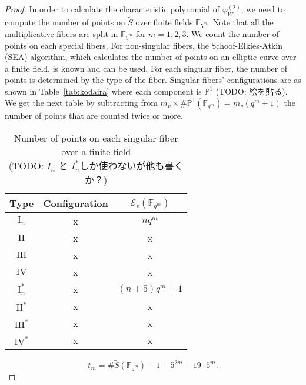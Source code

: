 \documentclass[main]{subfiles}
\begin{document}
\begin{proof}
    In order to calculate the characteristic polynomial of $\varphi^{(2)}_{W}$, we need to compute the number of points on $\tilde{S}$ over finite fields $\mathbb{F}_{5^{m}}$.
    Note that all the multiplicative fibers are split in $\mathbb{F}_{5^{m}}$ for $m=1,2,3$.
    We count the number of points on each special fibers.
    For non-singular fibers, the Schoof-Elkies-Atkin (SEA) algorithm, which calculates the number of points on an elliptic curve over a finite field, is known and can be used.
    For each singular fiber, the number of points is determined by the type of the fiber.
    Singular fibers' configurations are as shown in Table~\ref{tab:kodaira} where each component is $\mathbb{P}^{1}$ (TODO: 絵を貼る).
    We get the next table by subtracting from $m_v\times\#\mathbb{P}^1(\mathbb{F}_{q^m}) = m_v(q^m + 1)$ the number of points that are counted twice or more.
    \begin{table}[ht]
        \centering
        \caption{Number of points on each singular fiber over a finite field\\ (TODO: $I_n$ と $I_n^*$しか使わないが他も書くか？)}
        \begin{tabular}{|c|c|c|}
            \hline
            Type             & Configuration & $\mathcal{E}_v(\mathbb{F}_{q^{m}})$ \\
            \hline
            $\mathrm{I}_n$   & x             & $nq^m$                              \\
            $\mathrm{II}$    & x             & x                                   \\
            $\mathrm{III}$   & x             & x                                   \\
            $\mathrm{IV}$    & x             & x                                   \\
            $\mathrm{I}_n^*$ & x             & $(n+5) q^m+1$                         \\
            $\mathrm{II}^*$  & x             & x                                \\
            $\mathrm{III}^*$ & x             & x                                 \\
            $\mathrm{IV}^*$  & x             & x                                 \\
            \hline
        \end{tabular}
    \end{table}
    
    \begin{equation*}
        t_{m} = \# \tilde{S}(\mathbb{F}_{5^{m}}) - 1 - 5^{2m} - 19 \cdot 5^{m}.
    \end{equation*}


\end{proof}
\end{document}
